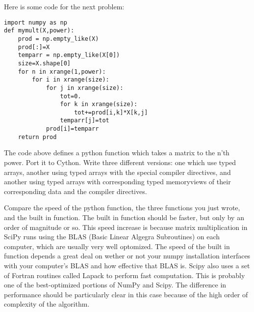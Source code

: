 Here is some code for the next problem:
\begin{verbatim}
import numpy as np
def mymult(X,power):
    prod = np.empty_like(X)
    prod[:]=X
    temparr = np.empty_like(X[0])
    size=X.shape[0]
    for n in xrange(1,power):
        for i in xrange(size):
            for j in xrange(size):
                tot=0.
                for k in xrange(size):
                    tot+=prod[i,k]*X[k,j]
                temparr[j]=tot
            prod[i]=temparr
    return prod
\end{verbatim}

\begin{problem}
The code above defines a python function which takes a matrix to the n'th power.
Port it to Cython. Write three different versions: one which use typed arrays, another using typed arrays with the special compiler directives, and another using typed arrays with corresponding typed memoryviews of their corresponding data and the compiler directives.

Compare the speed of the python function, the three functions you just wrote, and the built in  function.
The built in function should be faster, but only by an order of magnitude or so.
This speed increase is because matrix multiplication in SciPy runs using the BLAS (Basic Linear Algegra Subroutines) on each computer, which are usually very well optomized.
The speed of the built in function depends a great deal on wether or not your numpy installation interfaces with your computer's BLAS and how effective that BLAS is.
Scipy also uses a set of Fortran routines called Lapack to perform fast computation.
This is probably one of the best-optimized portions of NumPy and Scipy.
The difference in performance should be particularly clear in this case because of the high order of complexity of the algorithm.
\end{problem}
